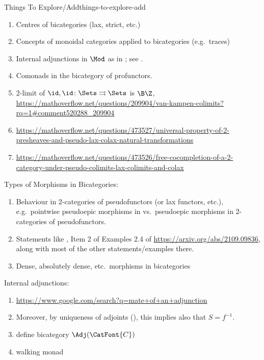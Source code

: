 \begin{remark}{Things To Explore/Add}{things-to-explore-add}
\begin{enumerate}
        \item Centres of bicategories (lax, strict, etc.)
        \item Concepts of monoidal categories applied to bicategories (e.g.\ traces)
        \item Internal adjunctions in $\Mod$ as in \cite[Section 6.3]{2-categories-book}; see \cite[Example 6.2.6]{2-categories-book}.
        \item Comonads in the bicategory of profunctors.
        \item 2-limit of $\id,\id\colon\Sets\rightrightarrows\Sets$ is $\B\Z$, \url{https://mathoverflow.net/questions/209904/van-kampen-colimits?rq=1#comment520288_209904}
        \item \url{https://mathoverflow.net/questions/473527/universal-property-of-2-presheaves-and-pseudo-lax-colax-natural-transformations}
        \item \url{https://mathoverflow.net/questions/473526/free-cocompletion-of-a-2-category-under-pseudo-colimits-lax-colimits-and-colax}
    \end{enumerate}
    Types of Morphisms in Bicategories:
    \begin{enumerate}
        \item Behaviour in 2-categories of pseudofunctors (or lax functors, etc.), e.g.\ pointwise pseudoepic morphisms in vs.\ pseudoepic morphisms in 2-categories of pseudofunctors.
        \item Statements like , Item 2 of Examples 2.4 of \url{https://arxiv.org/abs/2109.09836}, along with most of the other statements/examples there.
        \item Dense, absolutely dense, etc.\ morphisms in bicategories
    \end{enumerate}
    Internal adjunctions:
    \begin{enumerate}
        \item \url{https://www.google.com/search?q=mate+of+an+adjunction}
        \item Moreover, by uniqueness of adjoints (), this implies also that $S=f^{-1}$.
        \item define bicategory $\Adj(\CatFont{C})$
        \item walking monad

\end{enumerate}
\end{remark}
